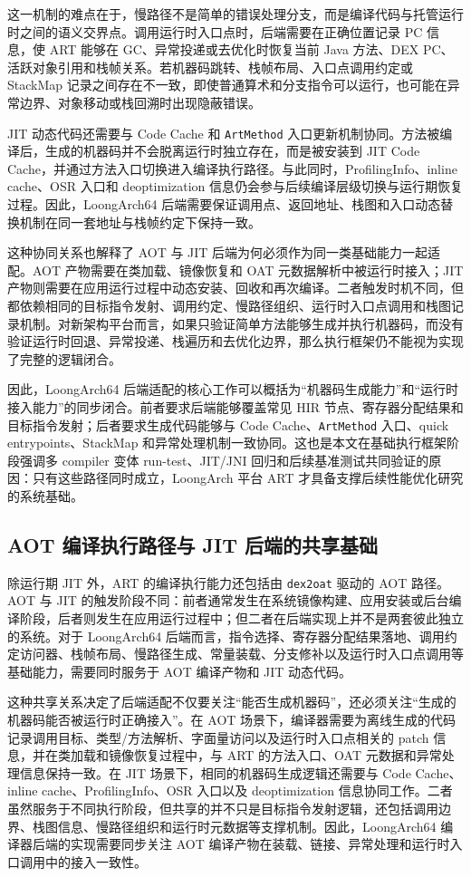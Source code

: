 这一机制的难点在于，慢路径不是简单的错误处理分支，而是编译代码与托管运行时之间的语义交界点。调用运行时入口点时，后端需要在正确位置记录 PC 信息，使 ART 能够在 GC、异常投递或去优化时恢复当前 Java 方法、DEX PC、活跃对象引用和栈帧关系。若机器码跳转、栈帧布局、入口点调用约定或 StackMap 记录之间存在不一致，即使普通算术和分支指令可以运行，也可能在异常边界、对象移动或栈回溯时出现隐蔽错误。

JIT 动态代码还需要与 Code Cache 和 \texttt{ArtMethod} 入口更新机制协同。方法被编译后，生成的机器码并不会脱离运行时独立存在，而是被安装到 JIT Code Cache，并通过方法入口切换进入编译执行路径。与此同时，ProfilingInfo、inline cache、OSR 入口和 deoptimization 信息仍会参与后续编译层级切换与运行期恢复过程\citep{Fink2003,Lameed2013}。因此，LoongArch64 后端需要保证调用点、返回地址、栈图和入口动态替换机制在同一套地址与栈帧约定下保持一致。

这种协同关系也解释了 AOT 与 JIT 后端为何必须作为同一类基础能力一起适配。AOT 产物需要在类加载、镜像恢复和 OAT 元数据解析中被运行时接入；JIT 产物则需要在应用运行过程中动态安装、回收和再次编译。二者触发时机不同，但都依赖相同的目标指令发射、调用约定、慢路径组织、运行时入口点调用和栈图记录机制。对新架构平台而言，如果只验证简单方法能够生成并执行机器码，而没有验证运行时回退、异常投递、栈遍历和去优化边界，那么执行框架仍不能视为实现了完整的逻辑闭合。

因此，LoongArch64 后端适配的核心工作可以概括为“机器码生成能力”和“运行时接入能力”的同步闭合。前者要求后端能够覆盖常见 HIR 节点、寄存器分配结果和目标指令发射；后者要求生成代码能够与 Code Cache、\texttt{ArtMethod} 入口、quick entrypoints、StackMap 和异常处理机制一致协同。这也是本文在基础执行框架阶段强调多 compiler 变体 run-test、JIT/JNI 回归和后续基准测试共同验证的原因：只有这些路径同时成立，LoongArch 平台 ART 才具备支撑后续性能优化研究的系统基础。

\subsection{AOT 编译执行路径与 JIT 后端的共享基础}

除运行期 JIT 外，ART 的编译执行能力还包括由 \texttt{dex2oat} 驱动的 AOT 路径。AOT 与 JIT 的触发阶段不同：前者通常发生在系统镜像构建、应用安装或后台编译阶段，后者则发生在应用运行过程中；但二者在后端实现上并不是两套彼此独立的系统。对于 LoongArch64 后端而言，指令选择、寄存器分配结果落地、调用约定访问器、栈帧布局、慢路径生成、常量装载、分支修补以及运行时入口点调用等基础能力，需要同时服务于 AOT 编译产物和 JIT 动态代码。

这种共享关系决定了后端适配不仅要关注“能否生成机器码”，还必须关注“生成的机器码能否被运行时正确接入”。在 AOT 场景下，编译器需要为离线生成的代码记录调用目标、类型/方法解析、字面量访问以及运行时入口点相关的 patch 信息，并在类加载和镜像恢复过程中，与 ART 的方法入口、OAT 元数据和异常处理信息保持一致。在 JIT 场景下，相同的机器码生成逻辑还需要与 Code Cache、inline cache、ProfilingInfo、OSR 入口以及 deoptimization 信息协同工作。二者虽然服务于不同执行阶段，但共享的并不只是目标指令发射逻辑，还包括调用边界、栈图信息、慢路径组织和运行时元数据等支撑机制。因此，LoongArch64 编译器后端的实现需要同步关注 AOT 编译产物在装载、链接、异常处理和运行时入口调用中的接入一致性。

